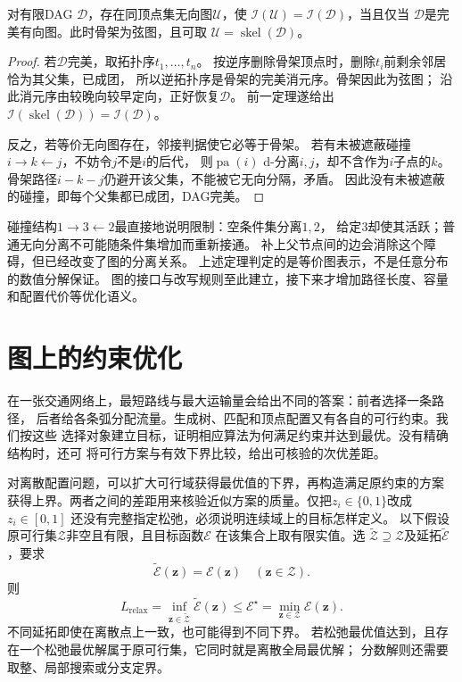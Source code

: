 \begin{theorem}[有向图的完美无向图表示]
  \label{thm:graph-theory-perfect-undirected}
  对有限DAG \(\mathcal D\)，存在同顶点集无向图\(\mathcal U\)，使
  \(\mathcal I(\mathcal U)=\mathcal I(\mathcal D)\)，当且仅当
  \(\mathcal D\)是完美有向图。此时骨架为弦图，且可取
  \(\mathcal U=\operatorname{skel}(\mathcal D)\)。
\end{theorem}

\begin{proof}
若\(\mathcal D\)完美，取拓扑序\(t_1,\ldots,t_n\)。
按逆序删除骨架顶点时，删除\(t_i\)前剩余邻居恰为其父集，已成团，
所以逆拓扑序是骨架的完美消元序。骨架因此为弦图；
沿此消元序由较晚向较早定向，正好恢复\(\mathcal D\)。
前一定理遂给出
\(\mathcal I(\operatorname{skel}(\mathcal D))=\mathcal I(\mathcal D)\)。

反之，若等价无向图存在，邻接判据使它必等于骨架。
若有未被遮蔽碰撞\(i\to k\leftarrow j\)，不妨令\(j\)不是\(i\)的后代，
则\(\operatorname{pa}(i)\) d-分离\(i,j\)，却不含作为\(i\)子点的\(k\)。
骨架路径\(i-k-j\)仍避开该父集，不能被它无向分隔，矛盾。
因此没有未被遮蔽的碰撞，即每个父集都已成团，DAG完美。
\end{proof}

碰撞结构\(1\to3\leftarrow2\)最直接地说明限制：空条件集分离\(1,2\)，
给定\(3\)却使其活跃；普通无向分离不可能随条件集增加而重新接通。
补上父节点间的边会消除这个障碍，但已经改变了图的分离关系。
上述定理判定的是等价图表示，不是任意分布的数值分解保证。
图的接口与改写规则至此建立，接下来才增加路径长度、容量和配置代价等优化语义。

\section{图上的约束优化}
\label{sec:graph-theory-exact-approximate-algorithms}

在一张交通网络上，最短路线与最大运输量会给出不同的答案：前者选择一条路径，
后者给各条弧分配流量。生成树、匹配和顶点配置又有各自的可行约束。我们按这些
选择对象建立目标，证明相应算法为何满足约束并达到最优。没有精确结构时，还可
将可行方案与有效下界比较，给出可核验的次优差距。

对离散配置问题，可以扩大可行域获得最优值的下界，再构造满足原约束的方案
获得上界。两者之间的差距用来核验近似方案的质量。仅把\(z_i\in\{0,1\}\)改成\(z_i\in[0,1]\)
还没有完整指定松弛，必须说明连续域上的目标怎样定义。
以下假设原可行集\(\mathcal Z\)非空且有限，且目标函数\(\mathcal E\)
在该集合上取有限实值。选
\(\widetilde{\mathcal Z}\supseteq\mathcal Z\)及延拓\(\widetilde{\mathcal E}\)，要求
\[
  \widetilde{\mathcal E}(\bm z)=\mathcal E(\bm z)\quad(\bm z\in\mathcal Z).
\]
则
\[
  L_{\mathrm{relax}}
  =\inf_{\bm z\in\widetilde{\mathcal Z}}\widetilde{\mathcal E}(\bm z)
  \leq \mathcal E^\star
  =\min_{\bm z\in\mathcal Z}\mathcal E(\bm z).
\]
不同延拓即使在离散点上一致，也可能得到不同下界。
若松弛最优值达到，且存在一个松弛最优解属于原可行集，它同时就是离散全局最优解；
分数解则还需要取整、局部搜索或分支定界。

